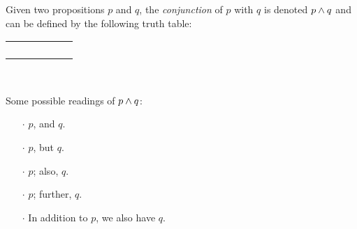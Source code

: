 \begin{definition}[Conjunction]
    \begin{center}
        \begin{minipage}[t]{.55\linewidth}
            Given two propositions \(p\) and \(q\), the \emph{conjunction} of \(p\) with \(q\)
            is denoted \(p \wedge q\) and can be defined by the following truth table:
            \begin{table}[H]
                \centering
                \label{tab:and}
                \begin{tabular}{|CcCc||Cc|} \hline
                     &  &  \\ \hline
                    \thead{\(\top\)} & \thead{\(\top\)} &  \\
                    \thead{\(\top\)} & \thead{\(\bot\)} &  \\
                    \thead{\(\bot\)} & \thead{\(\top\)} &  \\
                    \thead{\(\bot\)} & \thead{\(\bot\)} &  \\ \hline
                \end{tabular}
            \end{table}
        \end{minipage}%
        \begin{minipage}[t]{.05\linewidth}
            ~
        \end{minipage}%
        \begin{minipage}[t]{.4\linewidth}
            Some possible readings of \(p \wedge q\):\\
            \begin{itemize}
                \item[\(\cdot\)]
                    \(p\), and \(q\).
                \item[\(\cdot\)]
                    \(p\), but \(q\).
                \item[\(\cdot\)]
                    \(p\); also, \(q\).
                \item[\(\cdot\)]
                    \(p\); further, \(q\).
                \item[\(\cdot\)]
                    In addition to \(p\), we also have \(q\).
            \end{itemize}
        \end{minipage}
    \end{center}
\end{definition}


